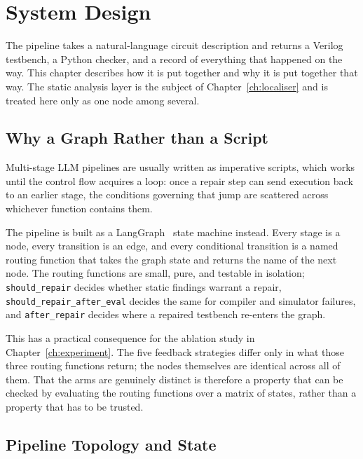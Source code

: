 \documentclass[11pt,a4paper,titlepage=false]{scrreprt}
\begin{document}
\chapter{System Design}\label{ch:design}

The pipeline takes a natural-language circuit description and returns a Verilog testbench,
a Python checker, and a record of everything that happened on the way. This chapter
describes how it is put together and why it is put together that way. The static analysis
layer is the subject of Chapter~\ref{ch:localiser} and is treated here only as one node
among several.

\section{Why a Graph Rather than a Script}\label{sec:design-graph}

Multi-stage LLM pipelines are usually written as imperative scripts, which works until the
control flow acquires a loop: once a repair step can send execution back to an earlier stage,
the conditions governing that jump are scattered across whichever function contains them.

The pipeline is built as a LangGraph~\cite{langgraph} state machine instead. Every stage is
a node, every transition is an edge, and every conditional transition is a named routing
function that takes the graph state and returns the name of the next node. The routing
functions are small, pure, and testable in isolation; \texttt{should\_repair} decides
whether static findings warrant a repair, \texttt{should\_repair\_after\_eval} decides the
same for compiler and simulator failures, and \texttt{after\_repair} decides where a
repaired testbench re-enters the graph.

This has a practical consequence for the ablation study in
Chapter~\ref{ch:experiment}. The five feedback strategies differ only in what those three
routing functions return; the nodes themselves are identical across all of them. That the
arms are genuinely distinct is therefore a property that can be checked by evaluating the
routing functions over a matrix of states, rather than a property that has to be trusted.

\section{Pipeline Topology and State}\label{sec:design-topology}
\end{document}
